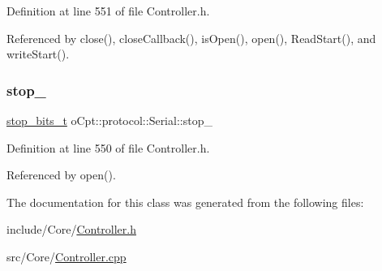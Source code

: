 Definition at line 551 of file Controller.\+h.



Referenced by close(), close\+Callback(), is\+Open(), open(), Read\+Start(), and write\+Start().

\hypertarget{classo_cpt_1_1protocol_1_1_serial_a0905cfeb2f2e21ce6a141e068813f75c}{}\label{classo_cpt_1_1protocol_1_1_serial_a0905cfeb2f2e21ce6a141e068813f75c} 
\subsubsection{\texorpdfstring{stop\+\_\+}{stop\_}}
{\footnotesize\ttfamily \hyperlink{classo_cpt_1_1protocol_1_1_serial_aadc4c803ade35920211e6c6a202a8c1f}{stop\+\_\+bits\+\_\+t} o\+Cpt\+::protocol\+::\+Serial\+::stop\+\_\+\hspace{0.3cm}{\ttfamily [protected]}}



Definition at line 550 of file Controller.\+h.



Referenced by open().



The documentation for this class was generated from the following files\+:\begin{DoxyCompactItemize}
\item 
include/\+Core/\hyperlink{_controller_8h}{Controller.\+h}\item 
src/\+Core/\hyperlink{_controller_8cpp}{Controller.\+cpp}\end{DoxyCompactItemize}
